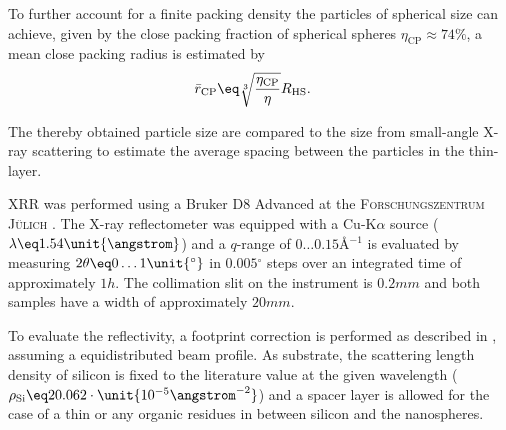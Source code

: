 \documentclass[\main/dresen_thesis.tex]{subfiles}
\begin{document}
    To further account for a finite packing density the particles of spherical size can achieve, given by the close packing fraction of spherical spheres $\eta_\mathrm{CP} \approx 74 \%$, a mean close packing radius is estimated by
    \begin{align}
      \begin{split}
        \label{eq:looselyPackedNP:layers:wignerSeitzClosePacking}
        \bar{r}_\mathrm{CP}       &\eq \sqrt[3]{\frac{\eta_\mathrm{CP}}{\eta}}R_\mathrm{HS}.
      \end{split}
    \end{align}

    The thereby obtained particle size are compared to the size from small-angle X-ray scattering to estimate the average spacing between the particles in the thin-layer.

    XRR was performed using a Bruker D8 Advanced at the \textsc{Forschungszentrum J\"ulich} .
    The X-ray reflectometer was equipped with a Cu-K$\alpha$ source ($\lambda \eq 1.54 \unit{\angstrom}$) and a $q$-range of $0 \ldots 0.15 \unit{\angstrom^{-1}}$ is evaluated by measuring $2 \theta \eq 0 \ldots 1 \unit{^\circ}$ in $0.005 \unit{^\circ}$ steps over an integrated time of approximately $1 \unit{h}$.
    The collimation slit on the instrument is $0.2 \unit{mm}$ and both samples have a width of approximately $20 \unit{mm}$.

    To evaluate the reflectivity, a footprint correction is performed as described in , assuming a equidistributed beam profile.
    As substrate, the scattering length density of silicon is fixed to the literature value at the given wavelength ($\rho_\mathrm{Si} \eq 20.062 \cdot \unit{10^{-5} \angstrom^{-2}}$) and a spacer layer is allowed for the case of a thin  or any organic residues in between silicon and the nanospheres.
\end{document}
